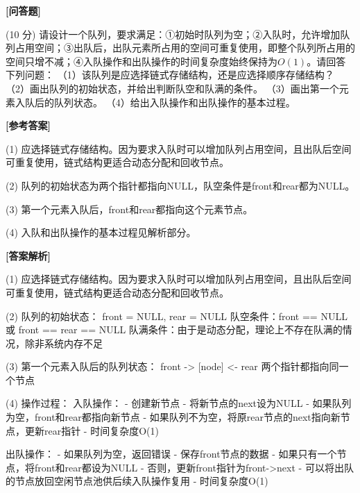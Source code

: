 \documentclass[12pt,a4paper]{article}
\newenvironment{choicequestion}[1][]{%
    \vspace{0.5cm}
    \noindent\textbf{[#1]}
    \vspace{0.2cm}
}{}
\newenvironment{answersection}{%
    \vspace{0.2cm}
    \noindent\textbf{[参考答案]}\\
    \vspace{0.1cm}
}{}
\newenvironment{analysissection}{%
    \vspace{0.2cm}
    \noindent\textbf{[答案解析]}\\
    \vspace{0.1cm}
}{}
\newcounter{questioncounter}
\newcommand{\question}[1]{%
    \stepcounter{questioncounter}%
    \noindent\textbf{\thequestioncounter} #1%
}
\begin{document}
\begin{choicequestion}[问答题]
\question{(10 分) 请设计一个队列，要求满足：①初始时队列为空；②入队时，允许增加队列占用空间；③出队后，出队元素所占用的空间可重复使用，即整个队列所占用的空间只增不减；④入队操作和出队操作的时间复杂度始终保持为$O(1)$。请回答下列问题：\newline
（1）该队列是应选择链式存储结构，还是应选择顺序存储结构？\newline
（2）画出队列的初始状态，并给出判断队空和队满的条件。\newline
（3）画出第一个元素入队后的队列状态。\newline
（4）给出入队操作和出队操作的基本过程。}

\begin{answersection}
(1) 应选择链式存储结构。因为要求入队时可以增加队列占用空间，且出队后空间可重复使用，链式结构更适合动态分配和回收节点。

(2) 队列的初始状态为两个指针都指向NULL，队空条件是front和rear都为NULL。

(3) 第一个元素入队后，front和rear都指向这个元素节点。

(4) 入队和出队操作的基本过程见解析部分。
\end{answersection}

\begin{analysissection}
(1) 应选择链式存储结构。因为要求入队时可以增加队列占用空间，且出队后空间可重复使用，链式结构更适合动态分配和回收节点。

(2) 队列的初始状态：
front = NULL, rear = NULL
队空条件：front == NULL 或 front == rear == NULL
队满条件：由于是动态分配，理论上不存在队满的情况，除非系统内存不足

(3) 第一个元素入队后的队列状态：
front -> [node] <- rear
两个指针都指向同一个节点

(4) 操作过程：
入队操作：
- 创建新节点
- 将新节点的next设为NULL
- 如果队列为空，front和rear都指向新节点
- 如果队列不为空，将原rear节点的next指向新节点，更新rear指针
- 时间复杂度O(1)

出队操作：
- 如果队列为空，返回错误
- 保存front节点的数据
- 如果只有一个节点，将front和rear都设为NULL
- 否则，更新front指针为front->next
- 可以将出队的节点放回空闲节点池供后续入队操作复用
- 时间复杂度O(1)
\end{analysissection}
\end{choicequestion}
\end{document}

